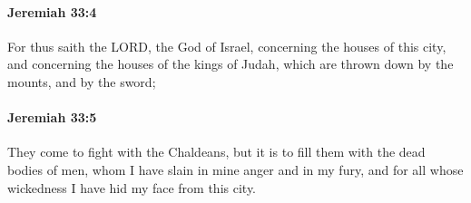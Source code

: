 		\paragraph{Jeremiah 33:4} %
			\label{JEREMIAH-33-4}

			For thus saith the LORD, the God of Israel, concerning the houses of this city, and concerning the houses of the kings of Judah, which are thrown down by the mounts, and by the sword;


		\paragraph{Jeremiah 33:5} %
			\label{JEREMIAH-33-5}

			They come to fight with the Chaldeans, but it is to fill them with the dead bodies of men, whom I have slain in mine anger and in my fury, and for all whose wickedness I have hid my face from this city.

